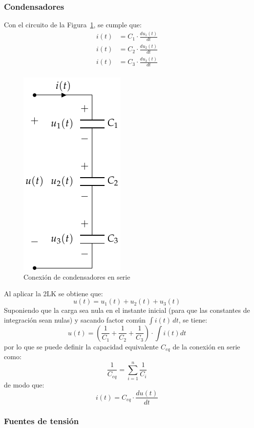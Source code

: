 		\subsubsection{Condensadores}
		Con el circuito de la Figura~\ref{fig.condensadores-serie}, se cumple que:
		\begin{align*}
			i(t) &= C_1 \cdot \frac{du_1(t)}{dt}\\
			i(t) &= C_2 \cdot \frac{du_2(t)}{dt}\\
			i(t) &= C_3 \cdot \frac{du_3(t)}{dt}\\
		\end{align*}
		\begin{figure}[H]
			\centering
			\includegraphics[width=0.2\linewidth]{../figs/CondensadoresSerie.pdf}
			\caption{Conexión de condensadores en serie}
			\label{fig.condensadores-serie}
		\end{figure}
		Al aplicar la 2LK se obtiene que: 
		\begin{equation*}
			u(t) = u_1(t) + u_2(t) + u_3(t)
		\end{equation*}
		Suponiendo que la carga sea nula en el instante inicial (para que las constantes de integración sean nulas) y sacando factor común $\int i(t)\,dt$, se tiene:
		\begin{equation*}
			u(t)=\left(\dfrac{1}{C_1}+\dfrac{1}{C_2}+\dfrac{1}{C_3} \right)\cdot \int i(t) dt
		\end{equation*}
		por lo que se puede definir la capacidad equivalente $C_{eq}$ de la conexión en serie como:
		\begin{equation}
			\boxed{\dfrac{1}{C_{eq}} = \sum_{i = 1}^n \dfrac{1}{C_i}}
		\end{equation}
		de modo que:
		\begin{equation*}
			i(t) = C_{eq} \cdot \frac{du(t)}{dt}
		\end{equation*}
		
		\subsubsection{Fuentes de tensión}
		
